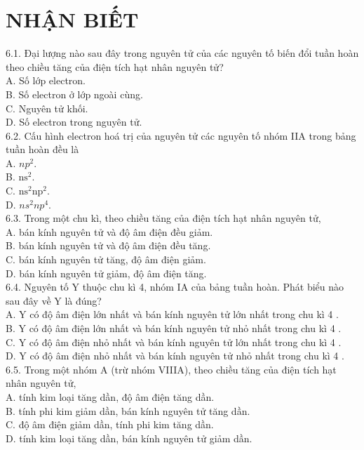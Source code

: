 \documentclass[10pt]{article}
\begin{document}
\section*{NHẬN BIẾT}
6.1. Đại lượng nào sau đây trong nguyên tử của các nguyên tố biến đổi tuần hoàn theo chiều tăng của điện tích hạt nhân nguyên tử?\\
A. Số lớp electron.\\
B. Số electron ở lớp ngoài cùng.\\
C. Nguyên tử khối.\\
D. Số electron trong nguyên tử.\\
6.2. Cấu hình electron hoá trị của nguyên tử các nguyên tố nhóm IIA trong bảng tuần hoàn đều là\\
A. $n p^{2}$.\\
B. $\mathrm{ns}^{2}$.\\
C. $\mathrm{ns}^{2} \mathrm{np}^{2}$.\\
D. $n s^{2} n p^{4}$.\\
6.3. Trong một chu kì, theo chiều tăng của điện tích hạt nhân nguyên tử,\\
A. bán kính nguyên tử và độ âm điện đều giảm.\\
B. bán kính nguyên tử và độ âm điện đều tăng.\\
C. bán kính nguyên tử tăng, độ âm điện giảm.\\
D. bán kính nguyên tử giảm, độ âm điện tăng.\\
6.4. Nguyên tố Y thuộc chu kì 4, nhóm IA của bảng tuần hoàn. Phát biểu nào sau đây về Y là đúng?\\
A. Y có độ âm điện lớn nhất và bán kính nguyên tử lớn nhất trong chu kì 4 .\\
B. Y có độ âm điện lớn nhất và bán kính nguyên tử nhỏ nhất trong chu kì 4 .\\
C. Y có độ âm điện nhỏ nhất và bán kính nguyên tử lớn nhất trong chu kì 4 .\\
D. Y có độ âm điện nhỏ nhất và bán kính nguyên tử nhỏ nhất trong chu kì 4 .\\
6.5. Trong một nhóm A (trừ nhóm VIIIA), theo chiều tăng của điện tích hạt nhân nguyên tử,\\
A. tính kim loại tăng dần, độ âm điện tăng dần.\\
B. tính phi kim giảm dần, bán kính nguyên tử tăng dần.\\
C. độ âm điện giảm dần, tính phi kim tăng dần.\\
D. tính kim loại tăng dần, bán kính nguyên tử giảm dần.\\
\end{document}
